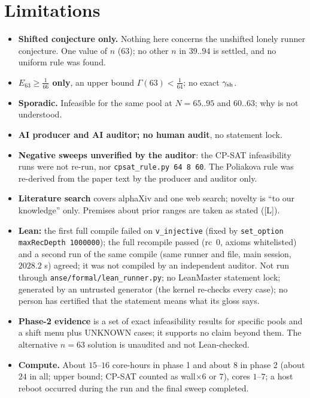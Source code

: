 \documentclass[10pt]{article}
\newcommand{\tier}[1]{\textsf{[#1]}}
\newcommand{\tL}{\tier{L}}
\newcommand{\lean}[1]{\texttt{#1}}
\begin{document}
\section{Limitations}\label{sec:lim}
\begin{itemize}\itemsep=1pt
\item \textbf{Shifted conjecture only.} Nothing here concerns the unshifted lonely runner conjecture. One value of $n$ ($63$); no other $n$ in $39..94$ is settled, and no uniform rule was found.
\item \textbf{$E_{63}\ge\frac1{66}$ only}, an upper bound $\Gamma(63)<\frac1{64}$; no exact $\gamma_{\rm sh}$.
\item \textbf{Sporadic.} Infeasible for the same pool at $N=65..95$ and $60..63$; why is not understood.
\item \textbf{AI producer and AI auditor; no human audit}, no statement lock.
\item \textbf{Negative sweeps unverified by the auditor}: the CP-SAT infeasibility runs were not re-run, nor \texttt{cpsat\_rule.py 64 8 60}. The Poliakova rule was re-derived from the paper text by the producer and auditor only.
\item \textbf{Literature search} covers alphaXiv and one web search; novelty is ``to our knowledge'' only. Premises about prior ranges are taken as stated (\tL{}).
\item \textbf{Lean:} the first full compile failed on \lean{v\_injective} (fixed by \texttt{set\_option maxRecDepth 1000000}); the full recompile passed (rc~0, axioms whitelisted) and a second run of the same compile (same runner and file, main session, $2028.2$ s) agreed; it was not compiled by an independent auditor. Not run through \texttt{anse/formal/lean\_runner.py}; no LeanMaster statement lock; generated by an untrusted generator (the kernel re-checks every case); no person has certified that the statement means what its gloss says.
\item \textbf{Phase-2 evidence} is a set of exact infeasibility results for specific pools and a shift menu plus UNKNOWN cases; it supports no claim beyond them. The alternative $n=63$ solution is unaudited and not Lean-checked.\item \textbf{Compute.} About $15$--$16$ core-hours in phase 1 and about $8$ in phase 2 (about $24$ in all; upper bound; CP-SAT counted as wall$\times6$ or $7$), cores $1$--$7$; a host reboot occurred during the run and the final sweep completed.
\end{itemize}
\end{document}
